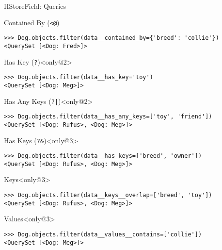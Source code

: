 \begin{frame}[fragile]{HStoreField: Queries}
\begin{block}{Contained By (\texttt{<}\texttt{@})}
\begin{verbatim}
>>> Dog.objects.filter(data__contained_by={'breed': 'collie'})
<QuerySet [<Dog: Fred>]>
        \end{verbatim}
    \end{block}
    \begin{block}{Has Key (\texttt{?})}<only@2>
        \begin{verbatim}
>>> Dog.objects.filter(data__has_key='toy')
<QuerySet [<Dog: Meg>]>
        \end{verbatim}
    \end{block}
    \begin{block}{Has Any Keys (\texttt{?}\texttt{|})}<only@2>
        \begin{verbatim}
>>> Dog.objects.filter(data__has_any_keys=['toy', 'friend'])
<QuerySet [<Dog: Rufus>, <Dog: Meg>]>
        \end{verbatim}
    \end{block}
    \begin{block}{Has Keys (\texttt{?}\texttt{\&})}<only@3>
        \begin{verbatim}
>>> Dog.objects.filter(data__has_keys=['breed', 'owner'])
<QuerySet [<Dog: Rufus>, <Dog: Meg>]>
        \end{verbatim}
    \end{block}
    \begin{block}{Keys}<only@3>
        \begin{verbatim}
>>> Dog.objects.filter(data__keys__overlap=['breed', 'toy'])
<QuerySet [<Dog: Rufus>, <Dog: Meg>]>
        \end{verbatim}
    \end{block}
    \begin{block}{Values}<only@3>
        \begin{verbatim}
>>> Dog.objects.filter(data__values__contains=['collie'])
<QuerySet [<Dog: Meg>]>
        \end{verbatim}
    \end{block}


\end{frame}
